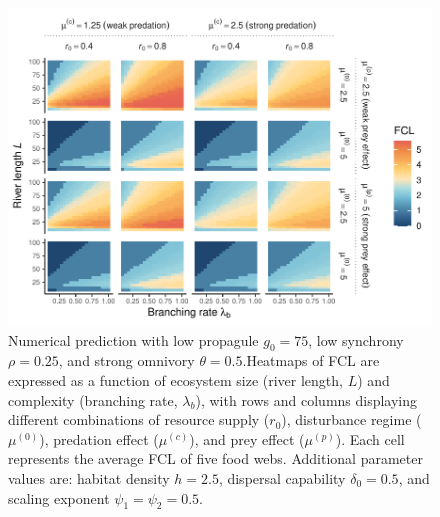 \begin{figure}
\centering
\includegraphics{../data_fmt/fig_rho025_g75_theta05.pdf}
\caption{Numerical prediction with low propagule \(g_0 = 75\), low
synchrony \(\rho = 0.25\), and strong omnivory \(\theta = 0.5\).Heatmaps
of FCL are expressed as a function of ecosystem size (river length,
\(L\)) and complexity (branching rate, \(\lambda_b\)), with rows and
columns displaying different combinations of resource supply (\(r_0\)),
disturbance regime (\(\mu^{(0)}\)), predation effect (\(\mu^{(c)}\)),
and prey effect (\(\mu^{(p)}\)). Each cell represents the average FCL of
five food webs. Additional parameter values are: habitat density
\(h=2.5\), dispersal capability \(\delta_0=0.5\), and scaling exponent
\(\psi_1=\psi_2=0.5\).\label{fig:fig-num5}}
\end{figure}

\newpage


